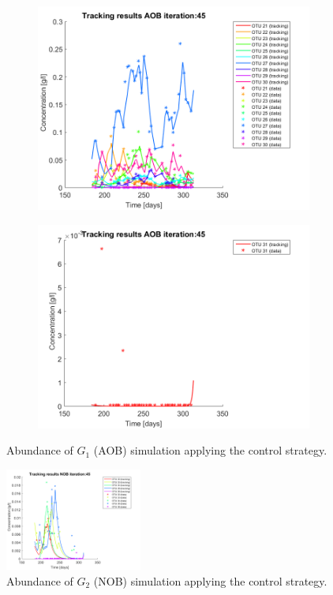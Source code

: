 \documentclass[3p,times]{elsarticle}
\begin{document}
\begin{figure}[h]
\begin{subfigure}{0.45 \textwidth}
	\includegraphics[width =\textwidth]{Application//191218_Reactor_A_AOB_iter_45_plot_3}
	\end{subfigure}
	\begin{subfigure}{0.45 \textwidth}
	\includegraphics[width =\textwidth]{Application//191218_Reactor_A_AOB_iter_45_plot_4}
	\end{subfigure}
	\caption{Abundance of $G_1$ (AOB) simulation applying the control strategy.}
	\label{AOBSimulation}
\end{figure}

\begin{figure}[h]
	\centering
	\includegraphics[width= 0.4\textwidth]{Application//191218_Reactor_A_NOB_iter_45_plot_1}
	\caption{Abundance of $G_2$ (NOB) simulation applying the control strategy.}
	\label{NOB Simulation}
\end{figure}
\end{document}
